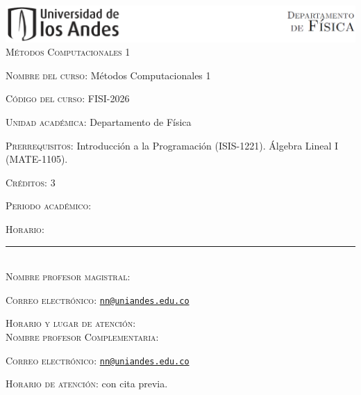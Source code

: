 \documentclass[letterpaper,10pt,onecolumn]{article}
\begin{document}
\begin{center}

\includegraphics[width=490pt]{header.png}\\[0.5cm]

\textsc{\LARGE M\'etodos Computacionales 1}\\[0.1cm]

\end{center}

\large \noindent\textsc{Nombre del curso:}  M\'etodos Computacionales 1 %
  
\noindent\textsc{C\'odigo del curso:}  FISI-2026 %

\noindent\textsc{Unidad acad\'emica:} Departamento de F\'isica

\noindent\textsc{Prerrequisitos}: Introducci\'on a la Programaci\'on
(ISIS-1221). \'Algebra Lineal I (MATE-1105). 

\noindent\textsc{Cr\'editos}: 3

\noindent\textsc{Periodo acad\'emico:} %

\noindent\textsc{Horario:}

\noindent\rule{\textwidth}{1pt}\\[-0.3cm]

\normalsize \noindent\textsc{Nombre profesor magistral:}

\noindent\textsc{Correo electr\'onico:}
\href{mailto:nn@uniandes.edu.co}{\nolinkurl{nn@uniandes.edu.co}}

\noindent\textsc{Horario y lugar de atenci\'on:} 
\\[-0.1cm]




\normalsize \noindent\textsc{Nombre profesor Complementaria:}

\noindent\textsc{Correo electr\'onico:}
\href{mailto:nn@uniandes.edu.co}{\nolinkurl{nn@uniandes.edu.co}}

\noindent\textsc{Horario de atenci\'on:} con cita previa. 
\\[-0.1cm]
\end{document}
